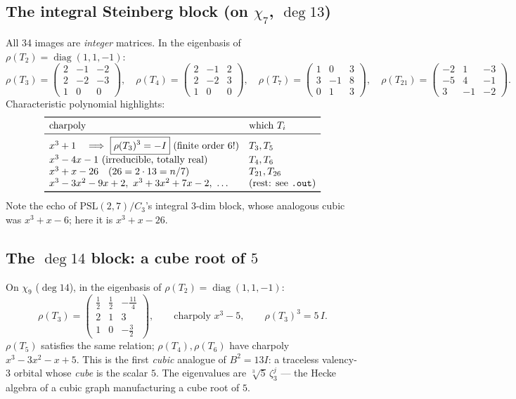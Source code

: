 \documentclass[11pt]{article}
\theoremstyle{remark}
\newcommand{\T}[1]{T_{#1}}
\newcommand{\rh}[1]{\rho(T_{#1})}
\begin{document}
\subsection{The integral Steinberg block (on $\chi_7$, $\deg 13$)}

All 34 images are \emph{integer} matrices. In the eigenbasis of
$\rho(\T2)=\operatorname{diag}(1,1,-1)$:
\[
\rh3 = \begin{pmatrix} 2&-1&-2\\ 2&-2&-3\\ 1&0&0\end{pmatrix},\quad
\rh4 = \begin{pmatrix} 2&-1&2\\ 2&-2&3\\ 1&0&0\end{pmatrix},\quad
\rh7 = \begin{pmatrix} 1&0&3\\ 3&-1&8\\ 0&1&3\end{pmatrix},\quad
\rh{21} = \begin{pmatrix} -2&1&-3\\ -5&4&-1\\ 3&-1&-2\end{pmatrix}.
\]
Characteristic polynomial highlights:
\[
\begin{array}{ll}
\toprule
\text{charpoly} & \text{which }\T i\\
\midrule
x^3+1\quad\Longrightarrow\ \boxed{\rho(\T3)^3=-I}\ \text{(finite order 6!)} & \T3,\T5\\
x^3-4x-1\ \text{(irreducible, totally real)} & \T4,\T6\\
x^3+x-26\quad (26=2\cdot13=n/7) & \T{21},\T{26}\\
x^3-3x^2-9x+2,\ x^3+3x^2+7x-2,\ \dots & \text{(rest: see \texttt{.out})}\\
\bottomrule
\end{array}
\]
Note the echo of $\mathrm{PSL}(2,7)/C_3$'s integral $3$-dim block,
whose analogous cubic was $x^3+x-6$; here it is $x^3+x-26$.

\subsection{The $\deg 14$ block: a cube root of $5$}

On $\chi_9$ ($\deg 14$), in the eigenbasis of
$\rho(\T2)=\operatorname{diag}(1,1,-1)$:
\[
\rh3 = \begin{pmatrix} \tfrac12&\tfrac12&-\tfrac{11}4\\ 2&1&3\\ 1&0&-\tfrac32\end{pmatrix},
\qquad
\text{charpoly } x^3 - 5,\qquad \boxed{\rho(\T3)^3 = 5\,I}.
\]
$\rho(\T5)$ satisfies the same relation; $\rho(\T4),\rho(\T6)$ have
charpoly $x^3-3x^2-x+5$. This is the first \emph{cubic} analogue of
$B^2=13I$: a traceless valency-3 orbital whose \emph{cube} is the scalar
$5$. The eigenvalues are $\sqrt[3]{5}\,\zeta_3^j$ --- the Hecke algebra
of a cubic graph manufacturing a cube root of $5$.
\end{document}
